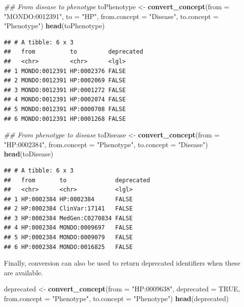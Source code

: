 \documentclass[9pt,a4paper,]{extarticle}
\newenvironment{Shaded}{\begin{snugshade}}{\end{snugshade}}
\newcommand{\CommentTok}[1]{\textcolor[rgb]{0.56,0.35,0.01}{\textit{#1}}}
\newcommand{\DataTypeTok}[1]{\textcolor[rgb]{0.13,0.29,0.53}{#1}}
\newcommand{\KeywordTok}[1]{\textcolor[rgb]{0.13,0.29,0.53}{\textbf{#1}}}
\newcommand{\NormalTok}[1]{#1}
\newcommand{\OtherTok}[1]{\textcolor[rgb]{0.56,0.35,0.01}{#1}}
\newcommand{\StringTok}[1]{\textcolor[rgb]{0.31,0.60,0.02}{#1}}
\begin{document}
\begin{Shaded}
\begin{Highlighting}[]
\CommentTok{## From disease to phenotype}
\NormalTok{toPhenotype <-}\StringTok{ }\KeywordTok{convert_concept}\NormalTok{(}\DataTypeTok{from =} \StringTok{"MONDO:0012391"}\NormalTok{,}
                               \DataTypeTok{to =} \StringTok{"HP"}\NormalTok{,}
                               \DataTypeTok{from.concept =} \StringTok{"Disease"}\NormalTok{,}
                               \DataTypeTok{to.concept =} \StringTok{"Phenotype"}\NormalTok{) }
\KeywordTok{head}\NormalTok{(toPhenotype)}
\end{Highlighting}
\end{Shaded}

\begin{verbatim}
## # A tibble: 6 x 3
##   from          to         deprecated
##   <chr>         <chr>      <lgl>     
## 1 MONDO:0012391 HP:0002376 FALSE     
## 2 MONDO:0012391 HP:0002069 FALSE     
## 3 MONDO:0012391 HP:0001272 FALSE     
## 4 MONDO:0012391 HP:0002074 FALSE     
## 5 MONDO:0012391 HP:0000708 FALSE     
## 6 MONDO:0012391 HP:0001268 FALSE
\end{verbatim}

\begin{Shaded}
\begin{Highlighting}[]
\CommentTok{## From phenotype to disease}
\NormalTok{toDisease <-}\StringTok{ }\KeywordTok{convert_concept}\NormalTok{(}\DataTypeTok{from =} \StringTok{"HP:0002384"}\NormalTok{,}
                               \DataTypeTok{from.concept =} \StringTok{"Phenotype"}\NormalTok{,}
                               \DataTypeTok{to.concept =} \StringTok{"Disease"}\NormalTok{) }
\KeywordTok{head}\NormalTok{(toDisease)}
\end{Highlighting}
\end{Shaded}

\begin{verbatim}
## # A tibble: 6 x 3
##   from       to              deprecated
##   <chr>      <chr>           <lgl>     
## 1 HP:0002384 HP:0002384      FALSE     
## 2 HP:0002384 ClinVar:17141   FALSE     
## 3 HP:0002384 MedGen:C0270834 FALSE     
## 4 HP:0002384 MONDO:0009697   FALSE     
## 5 HP:0002384 MONDO:0009079   FALSE     
## 6 HP:0002384 MONDO:0016825   FALSE
\end{verbatim}

Finally, conversion can also be used to return deprecated identifiers when these are available.

\begin{Shaded}
\begin{Highlighting}[]
\NormalTok{deprecated <-}\StringTok{ }\KeywordTok{convert_concept}\NormalTok{(}\DataTypeTok{from =} \StringTok{"HP:0009638"}\NormalTok{,}
                               \DataTypeTok{deprecated =} \OtherTok{TRUE}\NormalTok{,}
                               \DataTypeTok{from.concept =} \StringTok{"Phenotype"}\NormalTok{,}
                               \DataTypeTok{to.concept =} \StringTok{"Phenotype"}\NormalTok{) }
\KeywordTok{head}\NormalTok{(deprecated)}
\end{Highlighting}
\end{Shaded}
\end{document}
